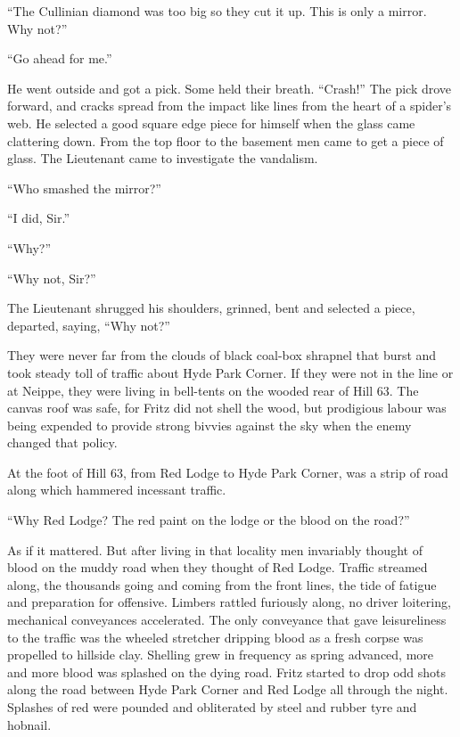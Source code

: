 ``The Cullinian diamond was too big so they cut it up. This is only a mirror. Why not?''

``Go ahead for me.''

He went outside and got a pick. Some held their breath. ``Crash!'' The pick drove forward, and cracks spread from the impact like lines from the heart of a spider's web. He selected a good square edge piece for himself when the glass came clattering down. From the top floor to the basement men came to get a piece of glass. The Lieutenant came to investigate the vandalism.

``Who smashed the mirror?''

``I did, Sir.''

``Why?''

``Why not, Sir?''

The Lieutenant shrugged his shoulders, grinned, bent and selected a piece, departed, saying, ``Why not?''

They were never far from the clouds of black coal-box shrapnel that burst and took steady toll of traffic about Hyde Park Corner. If they were not in the line or at Neippe, they were living in bell-tents on the wooded rear of Hill 63. The canvas roof was safe, for Fritz did not shell the wood, but prodigious labour was being expended to provide strong bivvies against the sky when the enemy changed that policy.

At the foot of Hill 63, from Red Lodge to Hyde Park Corner, was a strip of road along which hammered incessant traffic.

``Why Red Lodge? The red paint on the lodge or the blood on the road?''

As if it mattered. But after living in that locality men invariably thought of blood on the muddy road when they thought of Red Lodge. Traffic streamed along, the thousands going and coming from the front lines, the tide of fatigue and preparation for offensive. Limbers rattled furiously along, no driver loitering, mechanical conveyances accelerated. The only conveyance that gave leisureliness to the traffic was the wheeled stretcher dripping blood as a fresh corpse was propelled to hillside clay. Shelling grew in frequency as spring advanced, more and more blood was splashed on the dying road. Fritz started to drop odd shots along the road between Hyde Park Corner and Red Lodge all through the night. Splashes of red were pounded and obliterated by steel and rubber tyre and hobnail.

